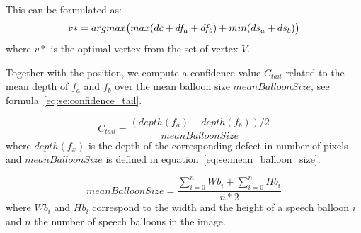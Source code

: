 This can be formulated as:
\begin{equation}\label{eq:se:optimisation}
   v* = argmax\big( max(dc+df_a+df_b) + min(ds_a + ds_b) \big)\\
 \end{equation}
 where $v*$ is the optimal vertex from the set of vertex $V$.

Together with the position, we compute a confidence value $C_{tail}$ related to the mean depth of $f_a$ and $f_b$ over the mean balloon size $meanBalloonSize$, see formula~\ref{eq:se:confidence_tail}.

\begin{equation}
\label{eq:se:confidence_tail}
  C_{tail} = \frac{(depth(f_a)+depth(f_b))/2}{meanBalloonSize}
\end{equation}
where $depth(f_x)$ is the depth of the corresponding defect in number of pixels and $meanBalloonSize$ is defined in equation~\ref{eq:se:mean_balloon_size}.


\begin{equation}
  \label{eq:se:mean_balloon_size}
  meanBalloonSize = \frac{\sum\limits_{i=0}^n Wb_i + \sum\limits_{i=0}^n Hb_i}{n * 2}  
\end{equation}
where $Wb_i$ and $Hb_i$ correspond to the width and the height of a speech  balloon $i$ and $n$ the number of speech balloons in the image.



